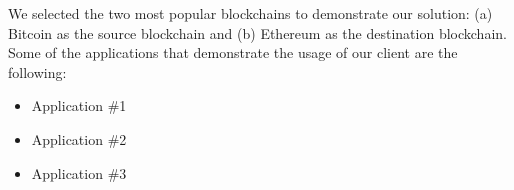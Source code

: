 We selected the two most popular blockchains to demonstrate our solution: (a)
Bitcoin as the source blockchain and (b) Ethereum as the destination
blockchain. Some of the applications that demonstrate the usage of our client
are the following:

\begin{itemize}
    \item{Application \#1}
    \item{Application \#2}
    \item{Application \#3}
\end{itemize}

\pagebreak

